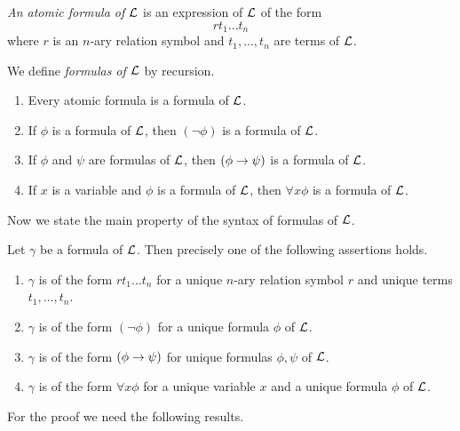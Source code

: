 \documentclass[10pt]{amsart}
\begin{document}
\begin{definition}
	\textit{An atomic formula of ${\mathcal L}$} is an expression of ${\mathcal L}$ of the form
	$$rt_1...t_n$$
	where $r$ is an $n$-ary relation symbol and $t_1, ...,t_n$ are terms of ${\mathcal L}$.
\end{definition}

\begin{definition}
	We define \textit{formulas of ${\mathcal L}$} by recursion.
	\begin{enumerate}[label=\textbf{(\arabic*)}, leftmargin=3.0em]
		\item Every atomic formula is a formula of ${\mathcal L}$.
		\item If $\phi$ is a formula of ${\mathcal L}$, then $(\neg \phi)$ is a formula of ${\mathcal L}$.
		\item If $\phi$ and $\psi$ are formulas of ${\mathcal L}$, then $(\phi\rightarrow \psi)$ is a formula of ${\mathcal L}$.
		\item If $x$ is a variable and $\phi$ is a formula of ${\mathcal L}$, then $\forall x\phi$ is a formula of ${\mathcal L}$.
	\end{enumerate}
\end{definition}
\noindent
Now we state the main property of the syntax of formulas of ${\mathcal L}$.

\begin{theorem}\label{theorem:unique_readability_of_formulas}
	Let $\gamma$ be a formula of ${\mathcal L}$. Then precisely one of the following assertions holds.
	\begin{enumerate}[label=\textbf{\emph{(\arabic*)}}, leftmargin=3.0em]
		\item $\gamma$ is of the form $rt_1...t_n$ for a unique $n$-ary relation symbol $r$ and unique terms $t_1 , ..., t_n$.
		\item $\gamma$ is of the form $(\neg \phi)$ for a unique formula $\phi$ of ${\mathcal L}$.
		\item $\gamma$ is of the form $(\phi \rightarrow \psi)$ for unique formulas $\phi, \psi$ of ${\mathcal L}$.
		\item $\gamma$ is of the form $\forall x \phi$ for a unique variable $x$ and a unique formula $\phi$ of ${\mathcal L}$.
	\end{enumerate}
\end{theorem}
\noindent
For the proof we need the following results.
\end{document}

